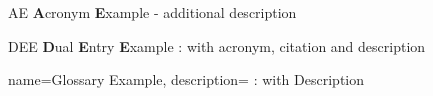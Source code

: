 %
%


\usepackage{xparse}

 {
	\makeglossaries
}





	{AE}
	{\textbf{A}cronym \textbf{E}xample - additional description}




	{DEE}
	{\textbf{D}ual \textbf{E}ntry \textbf{E}xample}
	{
		\cite{Bibtex2021} : with acronym, citation and description
	}




	{
		name=Glossary Example,
		description={
			\cite{Styles2021} : with Description
		}
	}

